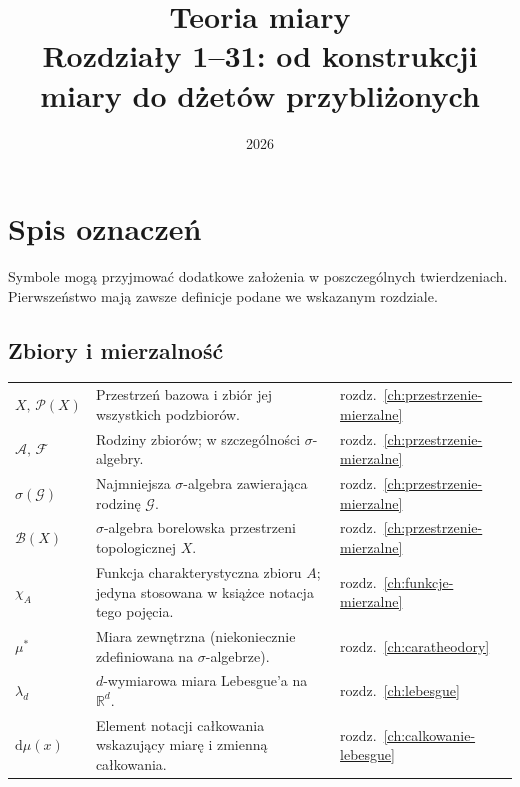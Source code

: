 \documentclass[11pt,a4paper,oneside]{book}
\title{Teoria miary\\\large Rozdziały 1--31: od konstrukcji miary do dżetów przybliżonych}
\author{}
\date{2026}
\numberwithin{equation}{chapter}
\theoremstyle{plain}
\theoremstyle{definition}
\theoremstyle{remark}
\begin{document}
\frontmatter
\hypersetup{pageanchor=false}
\maketitle
\hypersetup{pageanchor=true}
\tableofcontents

\chapter*{Spis oznaczeń}
\noindent Symbole mogą przyjmować dodatkowe założenia w poszczególnych twierdzeniach.
Pierwszeństwo mają zawsze definicje podane we wskazanym rozdziale.

\section*{Zbiory i mierzalność}
\begin{longtable}{@{}p{}p{}p{}@{}}
$X,\,\mathcal P(X)$ & Przestrzeń bazowa i zbiór jej wszystkich podzbiorów. & rozdz.~\ref{ch:przestrzenie-mierzalne} \\
$\mathcal A,\,\mathcal F$ & Rodziny zbiorów; w szczególności $\sigma$-algebry. & rozdz.~\ref{ch:przestrzenie-mierzalne} \\
$\sigma(\mathcal G)$ & Najmniejsza $\sigma$-algebra zawierająca rodzinę $\mathcal G$. & rozdz.~\ref{ch:przestrzenie-mierzalne} \\
$\mathcal B(X)$ & $\sigma$-algebra borelowska przestrzeni topologicznej $X$. & rozdz.~\ref{ch:przestrzenie-mierzalne} \\
$\chi_A$ & Funkcja charakterystyczna zbioru $A$; jedyna stosowana w książce notacja tego pojęcia. & rozdz.~\ref{ch:funkcje-mierzalne} \\
$\mu^*$ & Miara zewnętrzna (niekoniecznie zdefiniowana na $\sigma$-algebrze). & rozdz.~\ref{ch:caratheodory} \\
$\lambda_d$ & $d$-wymiarowa miara Lebesgue'a na $\mathbb R^d$. & rozdz.~\ref{ch:lebesgue} \\
$\mathrm d\mu(x)$ & Element notacji całkowania wskazujący miarę i zmienną całkowania. & rozdz.~\ref{ch:calkowanie-lebesgue} \\
\end{longtable}
\end{document}
